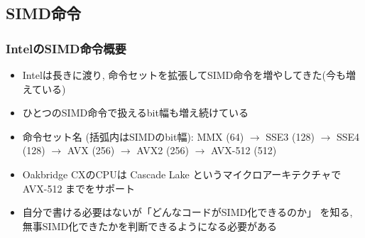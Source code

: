\documentclass[10pt,dvipdfmx]{beamer}
\newcommand{\ao}[1]{{\color{blue}#1}}
\begin{document}
\subsection{SIMD命令}

\begin{frame}
  \frametitle{IntelのSIMD命令概要}
  \begin{itemize}
  \item Intelは長きに渡り, 命令セットを拡張してSIMD命令を増やしてきた(今も増えている)
  \item ひとつのSIMD命令で扱えるbit幅も増え続けている
  \item 命令セット名 (括弧内はSIMDのbit幅):
    \ao{MMX} (64) $\rightarrow$ \ao{SSE3} (128) $\rightarrow$ \ao{SSE4} (128)
    $\rightarrow$ \ao{AVX} (256)
    $\rightarrow$ \ao{AVX2} (256)
    $\rightarrow$ \ao{AVX-512} (512)
\iffalse
  \item ReedbushのCPUは Broadwell というマイクロアーキテクチャで \ao{AVX2}
    までをサポート
\fi
  \item Oakbridge CXのCPUは Cascade Lake というマイクロアーキテクチャで \ao{AVX-512}
    までをサポート
    
  \item 自分で書ける必要はないが「どんなコードがSIMD化できるのか」
    を知る, 無事SIMD化できたかを判断できるようになる必要がある
  \end{itemize}
  
\end{frame}
\end{document}
